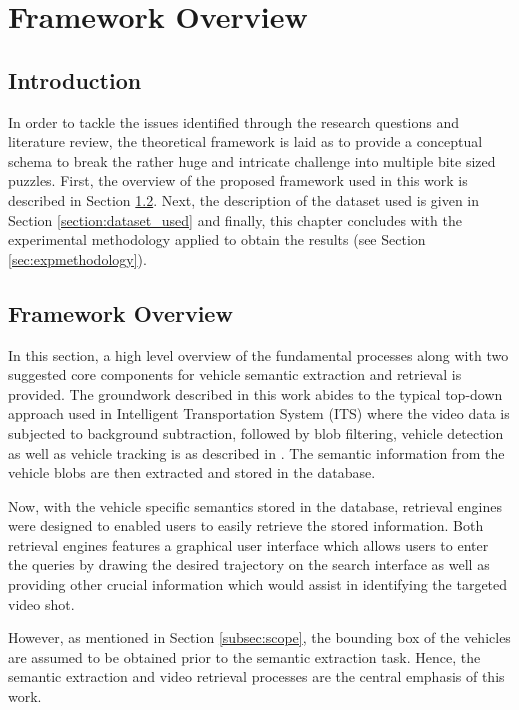 \chapter{Framework Overview}
\label{chapter:framework}
\section{Introduction}
In order to tackle the issues identified through the research questions and literature review, the theoretical framework is laid as to provide a conceptual schema to break the rather huge and intricate challenge into multiple bite sized puzzles. First, the overview of the proposed framework used in this work is described in Section \ref{section:framework}. Next, the description of the dataset used is given in Section \ref{section:dataset_used} and finally, this chapter concludes with the experimental methodology applied to obtain the results (see Section \ref{sec:expmethodology}).


\section{Framework Overview}
\label{section:framework}
In this section, a high level overview of the fundamental processes along with two suggested core components for vehicle semantic extraction and retrieval is provided.
The groundwork described in this work abides to the typical top-down approach used in Intelligent Transportation System (ITS) where the video data is subjected to background subtraction, followed by blob filtering, vehicle detection as well as vehicle tracking is as described in \cite{lim2017}.
The semantic information from the vehicle blobs are then extracted and stored in the database.

Now, with the vehicle specific semantics stored in the database, retrieval engines were designed to enabled users to easily retrieve the stored information. Both retrieval engines features a graphical user interface which allows users to enter the queries by drawing the desired trajectory on the search interface as well as providing other crucial information which would assist in identifying the targeted video shot.

However, as mentioned in Section \ref{subsec:scope}, the bounding box of the vehicles are assumed to be obtained prior to the semantic extraction task. Hence, the semantic extraction and video retrieval processes are the central emphasis of this work.

